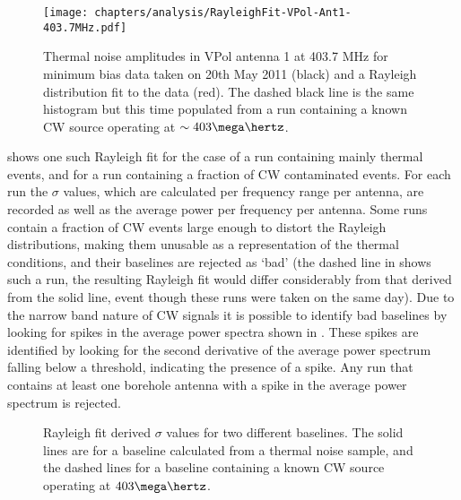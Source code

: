 \begin{figure}[htpb]
  \centering
  \texttt{[image: chapters/analysis/RayleighFit-VPol-Ant1-403.7MHz.pdf]}
  \caption{Thermal noise amplitudes in VPol antenna 1 at 403.7 MHz for minimum bias data taken on 20th May 2011 (black) and a Rayleigh distribution fit to the data (red). The dashed black line is the same histogram but this time populated from a run containing a known CW source operating at $\sim 403 \mega \hertz$.}
  \label{fig:analysis:CWRemoval:Baselines:Rayleigh-Fit}
\end{figure}



 shows one such Rayleigh fit for the case of a run containing mainly thermal events, and for a run containing a fraction of CW contaminated events. For each run the $\sigma$ values, which are calculated per frequency range per antenna, are recorded as well as the average power per frequency per antenna. Some runs contain a fraction of CW events large enough to distort the Rayleigh distributions, making them unusable as a representation of the thermal conditions, and their baselines are rejected as `bad' (the dashed line in  shows such a run, the resulting Rayleigh fit would differ considerably from that derived from the solid line, event though these runs were taken on the same day). Due to the narrow band nature of CW signals it is possible to identify bad baselines by looking for spikes in the average power spectra shown in . These spikes are identified by looking for the second derivative of the average power spectrum falling below a threshold, indicating the presence of a spike. Any run that contains at least one borehole antenna with a spike in the average power spectrum is rejected. 

\begin{figure}[htpb]
  \hfill
  \caption{Rayleigh fit derived $\sigma$ values for two different baselines. The solid lines are for a baseline calculated from a thermal noise sample, and the dashed lines for a baseline containing a known CW source operating at $403 \mega \hertz$.} 
  \label{fig:analysis:CWRemoval:Baselines:Rayleigh-Sigma}
\end{figure}

